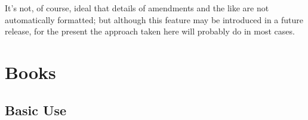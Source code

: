 \documentclass[a4paper,
               11pt,
	       DIV=1,			   
	       footinclude=false]
	      {scrartcl}
\newcommand{\egcite}[1]{{\texttt{\textbackslash cite#1}}}
\begin{document}
\begin{description}[leftmargin=3.6cm,labelwidth=3.4cm,labelsep=0.2cm]
\item[\egcite{\{echr:treaty\}}] \cite{echr:treaty}
\end{description}

It's not, of course, ideal that details of amendments and the like are
not automatically formatted; but although this feature may be
introduced in a future release, for the present the approach taken
here will probably do in most cases.

\section{Books}

\subsection{Basic Use}
\end{document}

